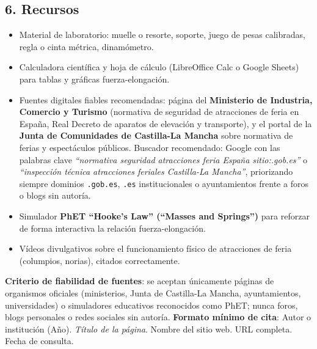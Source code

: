 \documentclass[11pt,a4paper]{article}
\begin{document}
\subsection*{6. Recursos}
\begin{itemize}
    \item Material de laboratorio: muelle o resorte, soporte, juego de pesas calibradas, regla o cinta métrica, dinamómetro.
    \item Calculadora científica y hoja de cálculo (LibreOffice Calc o Google Sheets) para tablas y gráficas fuerza-elongación.
    \item Fuentes digitales fiables recomendadas: página del \textbf{Ministerio de Industria, Comercio y Turismo} (normativa de seguridad de atracciones de feria en España, Real Decreto de aparatos de elevación y transporte), y el portal de la \textbf{Junta de Comunidades de Castilla-La Mancha} sobre normativa de ferias y espectáculos públicos. Buscador recomendado: Google con las palabras clave \textit{``normativa seguridad atracciones feria España sitio:.gob.es''} o \textit{``inspección técnica atracciones feriales Castilla-La Mancha''}, priorizando siempre dominios \texttt{.gob.es}, \texttt{.es} institucionales o ayuntamientos frente a foros o blogs sin autoría.
    \item Simulador \textbf{PhET ``Hooke's Law'' (``Masses and Springs'')} para reforzar de forma interactiva la relación fuerza-elongación.
    \item Vídeos divulgativos sobre el funcionamiento físico de atracciones de feria (columpios, norias), citados correctamente.
\end{itemize}
\textbf{Criterio de fiabilidad de fuentes}: se aceptan únicamente páginas de organismos oficiales (ministerios, Junta de Castilla-La Mancha, ayuntamientos, universidades) o simuladores educativos reconocidos como PhET; nunca foros, blogs personales o redes sociales sin autoría. \textbf{Formato mínimo de cita}: Autor o institución (Año). \textit{Título de la página}. Nombre del sitio web. URL completa. Fecha de consulta.
\end{document}
